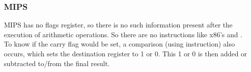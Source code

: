\subsubsection{MIPS}



MIPS has no flags register, so there is no such information present after the execution of arithmetic operations.
So there are no instructions like x86's  and .
To know if the carry flag would be set, a comparison (using  instruction) also occurs, 
which sets the destination register to 1 or 0.
This 1 or 0 is then added or subtracted to/from the final result.


